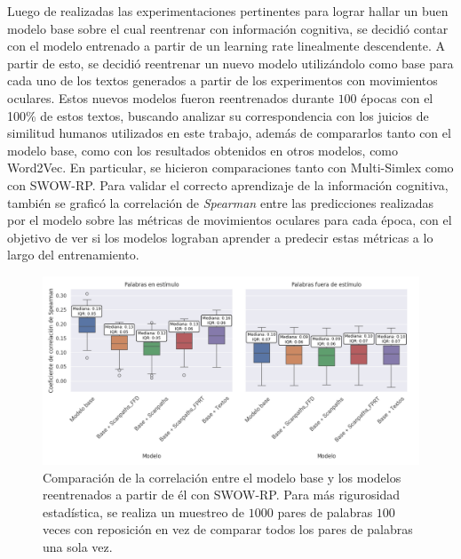 Luego de realizadas las experimentaciones pertinentes para lograr hallar un buen 
modelo base sobre el cual reentrenar con información cognitiva, se decidió contar 
con el modelo entrenado a partir de un learning rate linealmente descendente.
A partir de esto, se decidió reentrenar un nuevo modelo utilizándolo como base 
para cada uno de los textos generados a partir de los experimentos con 
movimientos oculares. Estos nuevos modelos fueron reentrenados durante 
$100$ épocas con el 100\% de estos textos, buscando analizar su correspondencia 
con los juicios de similitud humanos utilizados en este trabajo, además 
de compararlos tanto con el modelo base, como con los resultados obtenidos 
en otros modelos, como Word2Vec. En particular, se hicieron comparaciones 
tanto con Multi-Simlex como con SWOW-RP. Para validar el correcto aprendizaje 
de la información cognitiva, también se graficó la correlación de \textit{Spearman} 
entre las predicciones realizadas por el modelo sobre las métricas de 
movimientos oculares para cada época, con el objetivo de ver si los modelos 
lograban aprender a predecir estas métricas a lo largo del entrenamiento.



\begin{figure}[htb]
    \centering
    \includegraphics[width=1\textwidth]{imagenes/swow_lstm.png}
    \caption{Comparación de la correlación entre el modelo base y los modelos reentrenados 
    a partir de él con SWOW-RP. Para más rigurosidad estadística, se realiza un 
    muestreo de $1000$ pares de palabras $100$ veces con reposición en vez de 
    comparar todos los pares de palabras una sola vez.}
    \label{fig:swow_lstm}
\end{figure}

